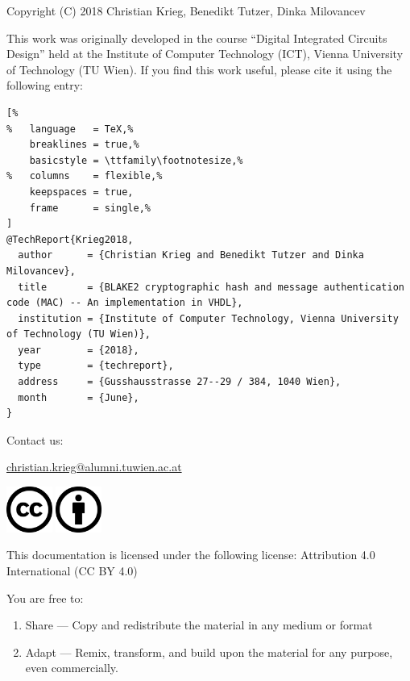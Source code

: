 \documentclass[%
	a4paper,
]
{article}
\begin{document}
Copyright (C) 2018 Christian Krieg, Benedikt Tutzer, Dinka Milovancev

This work was originally developed in the course ``Digital Integrated
Circuits Design'' held at the Institute of Computer Technology (ICT), Vienna
University of Technology (TU Wien). If you find this work useful, please
cite it using the following \BibTeX{ } entry:

\vspace{1em}

\begin{lstlisting}[%
%	language   = TeX,%
	breaklines = true,%
	basicstyle = \ttfamily\footnotesize,%
%	columns    = flexible,%
	keepspaces = true,
	frame      = single,%
]
@TechReport{Krieg2018,
  author      = {Christian Krieg and Benedikt Tutzer and Dinka Milovancev},
  title       = {BLAKE2 cryptographic hash and message authentication code (MAC) -- An implementation in VHDL},
  institution = {Institute of Computer Technology, Vienna University of Technology (TU Wien)},
  year        = {2018},
  type        = {techreport},
  address     = {Gusshausstrasse 27--29 / 384, 1040 Wien},
  month       = {June},
}
\end{lstlisting}

\vspace{3em}
Contact us:

\href{christian.krieg@alumni.tuwien.ac.at}{christian.krieg@alumni.tuwien.ac.at}

\vfill

\includegraphics[height=1.5cm]{fig/cc-large.png}
\includegraphics[height=1.5cm]{fig/by-large.png}


This documentation is licensed under the following license:
Attribution 4.0 International (CC BY 4.0)

\vspace{3em}

You are free to:

\begin{enumerate}
    \item Share --- Copy and redistribute the material in any medium or format
    \item Adapt --- Remix, transform, and build upon the material for any purpose,
			even commercially.
\end{enumerate}
\end{document}
